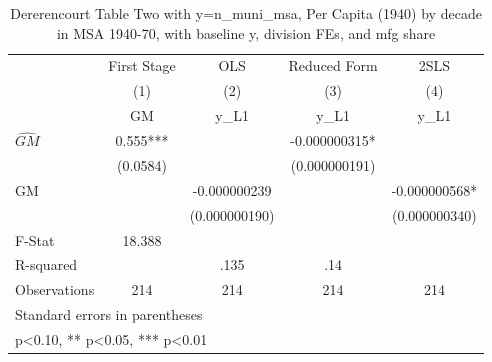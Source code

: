 \begin{table}[htbp]\centering
\def\sym#1{\ifmmode^{#1}\else\(^{#1}\)\fi}
\caption{Dererencourt Table Two with y=n\_muni\_msa, Per Capita (1940) by decade in MSA 1940-70, with baseline y, division FEs, and mfg share}
\begin{tabular}{l*{4}{c}}
\toprule
                    & First Stage   &         OLS   &Reduced Form   &        2SLS   \\
                    &\multicolumn{1}{c}{(1)}&\multicolumn{1}{c}{(2)}&\multicolumn{1}{c}{(3)}&\multicolumn{1}{c}{(4)}\\
                    &\multicolumn{1}{c}{GM}&\multicolumn{1}{c}{y\_L1}&\multicolumn{1}{c}{y\_L1}&\multicolumn{1}{c}{y\_L1}\\
\midrule
$\hat{GM}$          &       0.555***&               &-0.000000315*  &               \\
                    &    (0.0584)   &               &(0.000000191)   &               \\
\addlinespace
GM                  &               &-0.000000239   &               &-0.000000568*  \\
                    &               &(0.000000190)   &               &(0.000000340)   \\
\midrule
F-Stat              &      18.388   &               &               &               \\
R-squared           &               &        .135   &         .14   &               \\
Observations        &         214   &         214   &         214   &         214   \\
\bottomrule
\multicolumn{5}{l}{\footnotesize Standard errors in parentheses}\\
\multicolumn{5}{l}{\footnotesize * p<0.10, ** p<0.05, *** p<0.01}\\
\end{tabular}
\end{table}
